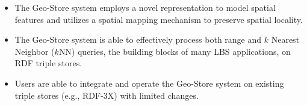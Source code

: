 \begin{itemize}
    \item The Geo-Store system employs a novel representation to
    model spatial features and utilizes a spatial mapping
    mechanism to preserve spatial locality.\vspace*{-3pt}

    \item The Geo-Store system is able to effectively process both range and $k$ Nearest Neighbor ($k$NN)
    queries, the building blocks of many LBS applications, on RDF triple stores.\vspace*{-3pt}

    \item Users are able to integrate and operate the Geo-Store system on
    existing triple stores (e.g., RDF-3X) with limited changes.\vspace*{-3pt}
\end{itemize}
